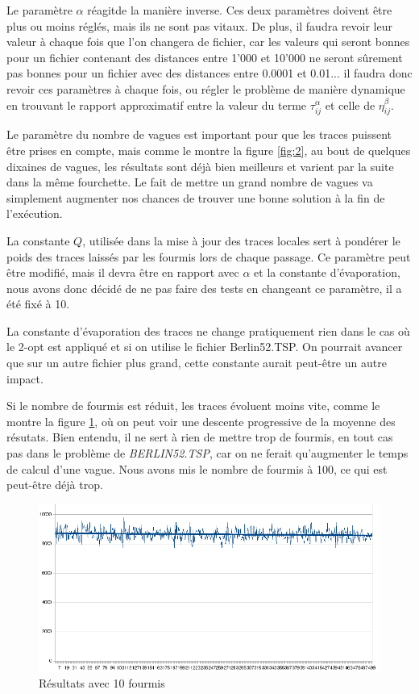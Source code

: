 \documentclass[a4paper, 11pt]{article}
\begin{document}
{	Le paramètre $\alpha$ réagitde la manière inverse. Ces deux paramètres doivent être plus ou moins réglés, mais ils ne sont pas vitaux. De plus, il faudra revoir leur valeur à chaque fois que l'on changera de fichier, car les valeurs qui seront bonnes pour un fichier contenant des distances entre 1'000 et 10'000 ne seront sûrement pas bonnes pour un fichier avec des distances entre 0.0001 et 0.01... il faudra donc revoir ces paramètres à chaque fois, ou régler le problème de manière dynamique en trouvant le rapport approximatif entre la valeur du terme $\tau^\alpha_{ij}$ et celle de $\eta^\beta_{ij}$.

	Le paramètre du nombre de vagues est important pour que les traces puissent être prises en compte, mais comme le montre la figure \ref{fig:2}, au bout de quelques dixaines de vagues, les résultats sont déjà bien meilleurs et varient par la suite dans la même fourchette. Le fait de mettre un grand nombre de vagues va simplement augmenter nos chances de trouver une bonne solution à la fin de l'exécution.

	La constante $Q$, utilisée dans la mise à jour des traces locales sert à pondérer le poids des traces laissés par les fourmis lors de chaque passage. Ce paramètre peut être modifié, mais il devra être en rapport avec $\alpha$ et la constante d'évaporation, nous avons donc décidé de ne pas faire des tests en changeant ce paramètre, il a été fixé à 10.

	La constante d'évaporation des traces  ne change pratiquement rien dans le cas où le 2-opt est appliqué et si on utilise le fichier Berlin52.TSP. On pourrait avancer que sur un autre fichier plus grand, cette constante aurait peut-être un autre impact.

	Si le nombre de fourmis est réduit, les traces évoluent moins vite, comme le montre la figure \ref{fig:7}, où on peut voir une descente progressive de la moyenne des résutats. Bien entendu, il ne sert à rien de mettre trop de fourmis, en tout cas pas dans le problème de \textit{BERLIN52.TSP}, car on ne ferait qu'augmenter le temps de calcul d'une vague. Nous avons mis le nombre de fourmis à 100, ce qui est peut-être déjà trop.

\begin{figure}[H]
   \begin{center}
      \includegraphics[width=14cm]{../images/7.png}
   \end{center}
   \caption{Résultats avec 10 fourmis}
	\label{fig:7}
\end{figure}

}
\end{document}
